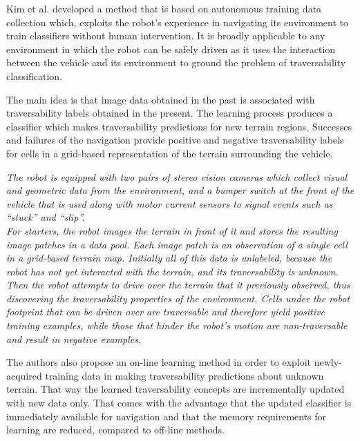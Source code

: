 \documentclass[12pt,a4paper]{report}
\newcommand{\example}{\enquote}
\begin{document}
	
	
	
	
	Kim et al. \cite{Kim} developed a method 
	that is based on autonomous training data collection which, exploits the 
	robot’s experience in navigating its environment to train classifiers without 
	human intervention. It is broadly applicable to any environment in which 
	the robot can be safely driven as it uses the interaction between the vehicle
	and its environment to ground the problem of traversability classification.
	
	The main idea is that image data  obtained in the past is associated with 
	traversability labels obtained in the  present. The learning process produces a 
	classifier which makes traversability  predictions for new terrain regions. 
	Successes and failures of the navigation provide positive and negative 
	traversability labels for cells in a grid-based representation of the terrain surrounding 
	the vehicle.
	
	\textit{The robot is equipped with two pairs of stereo vision cameras which 
	collect visual and geometric data from the environment, and a bumper switch
	at the front of the vehicle that is used along with motor current sensors to 
	signal events such as \example{stuck} and \example{slip}.
	\\
	For starters, the robot images the terrain in front of it and stores the 
	resulting image patches in a data pool. Each image patch is an observation 
	of a single cell in a grid-based terrain map. Initially all of this data is 
	unlabeled, because the robot has not yet interacted with the terrain, and its 
	traversability is unknown. 
	\\
	Then the robot attempts to drive over the terrain that it previously 
	observed, thus discovering the traversability properties of the environment. 
	Cells under the robot footprint that can be driven over are traversable and 
	therefore yield positive training examples, while those that hinder the robot’s 
	motion are non-traversable	and result in negative examples.}
	
	The authors also propose an on-line learning method in order to exploit 
	newly-acquired training data in making traversability predictions about 
	unknown terrain. That way the learned traversability concepts are 
	incrementally updated with new data only. That comes with the advantage that the 
	updated classifier is immediately available for navigation and that the 
	memory requirements for learning are reduced, compared to off-line methods.
	\\
	
\end{document}
